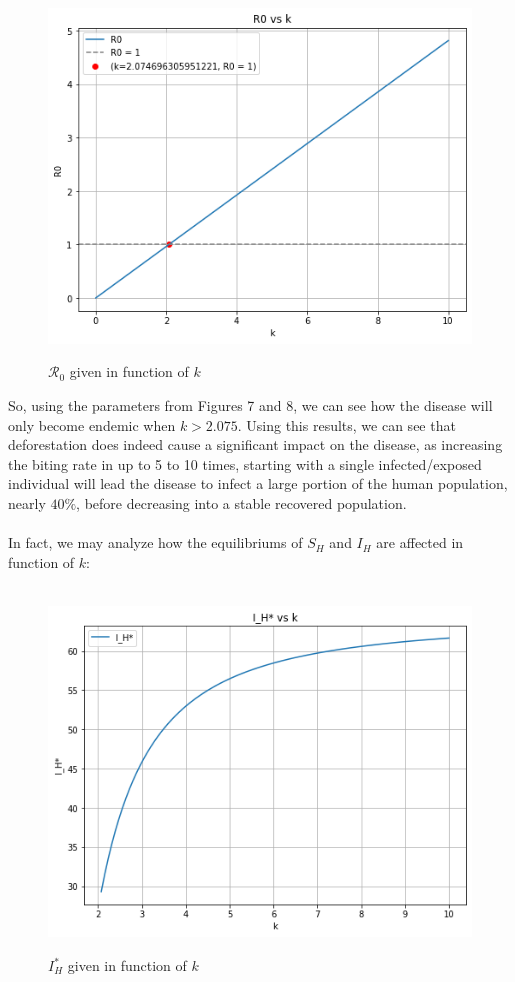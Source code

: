 \begin{figure}[!ht]
        \centering
        \hbox{\hspace{2.5em} \includegraphics[scale=0.75] {THESIS-R0_vs_k.png}}
        \caption{$\mathcal{R}_0$ given in function of $k$}
\end{figure}
\newpage
So, using the parameters from Figures 7 and 8, we can see how the disease 
will only become endemic when $k>2.075$. Using this results, we can see that
deforestation does indeed cause a significant impact on the disease,
as increasing the biting rate in up to 5 to 10 times, starting with a single 
infected/exposed individual will lead the disease to infect a large portion 
of the human population, nearly $40\%$, before decreasing into a stable 
recovered population.
\\\\
In fact, we may analyze how the equilibriums of $S_H$ and $I_H$ are 
affected in function of $k$:
\begin{figure}[!ht]
        \centering
        \hbox{\hspace{5.0em} \includegraphics[scale=0.6] {THESIS-Equilibrium_IH_vs_k.png}}
        \caption{$I_H^*$ given in function of $k$}
\end{figure}
